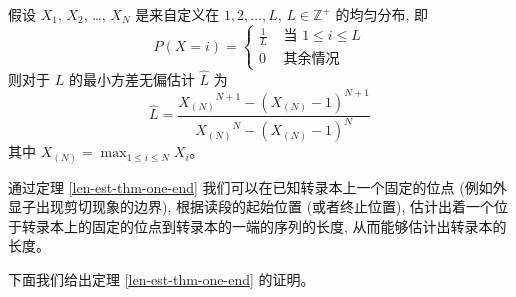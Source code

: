 \nocite{casella2002statistical} 

\begin{thm}
\label{len-est-thm-one-end}
假设 $X_1$, $X_2$, \ldots, $X_N$ 是来自定义在 
${1, 2, \ldots , L}$, $L \in \mathbb{Z}^+$ 的均匀分布, 
即 
\[
P(X = i) =  \begin{cases}
\frac{1}{L} & \text{ 当 } 1 \leq i \leq L \\
0 & \text{ 其余情况 }
\end{cases}
\]
则对于 $L$ 的最小方差无偏估计 $\hat{L}$ 为
\begin{equation}
\label{len-est-thm-on-end-eq}
\hat{L} = \frac{ {X_{(N)}}^{N+1} - (X_{(N)} - 1)^{N+1} }{ {X_{(N)}}^N - (X_{(N)} - 1)^N }
\end{equation}
其中 $X_{(N)} = \max_{1 \leq i \leq N} X_i$。 
\end{thm}

通过定理 \ref{len-est-thm-one-end} 我们可以在已知转录本上一个固定的位点 
(例如外显子出现剪切现象的边界), 根据读段的起始位置 (或者终止位置), 
估计出着一个位于转录本上的固定的位点到转录本的一端的序列的长度, 
从而能够估计出转录本的长度。 

下面我们给出定理 \ref{len-est-thm-one-end} 的证明。 


